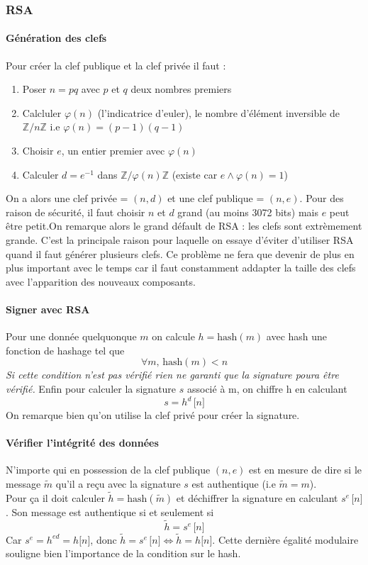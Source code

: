 \documentclass[a4paper, 12pt]{article}
\begin{document}
\subsubsection{RSA}
\paragraph{Génération des clefs}\label{keygenRSA}
\noindent Pour créer la clef publique et la clef privée il faut :
\begin{enumerate}
	\item Poser $n = pq$ avec $p$ et $q$ deux nombres premiers
	\item Calcluler $\varphi(n)$ (l'indicatrice d'euler), le nombre d'élément inversible de $\mathbb{Z}/n\mathbb{Z}$ i.e $\varphi\left( n\right) = (p-1)(q-1)$
	\item Choisir $e$, un entier premier avec $\varphi(n)$
	\item Calculer $d = e^{-1}$ dans $\mathbb{Z}/\varphi(n)\mathbb{Z}$ (existe car $e \wedge \varphi(n) = 1$) 
\end{enumerate}
On a alors une clef privée = $(n, d)$ et une clef publique = $(n,e)$. Pour des raison de sécurité, il faut choisir $n$ et $d$ grand (au moins 3072 bits) mais $e$ peut être petit.On remarque alors le grand défault de RSA :  les clefs sont extrèmement grande. C'est la principale raison pour laquelle on essaye d'éviter d'utiliser RSA quand il faut générer plusieurs clefs. Ce problème ne fera que devenir de plus en plus important avec le temps car il faut constamment addapter la taille des clefs avec l'apparition des nouveaux composants.

\paragraph{Signer avec RSA}
Pour une donnée quelquonque $m$ on calcule $h = \text{hash}(m)$ avec hash une fonction de hashage tel que 
$$
\forall m, \, \text{hash}(m) < n
$$ 
\emph{Si cette condition n'est pas vérifié rien ne garanti que la signature poura être vérifié.}
Enfin pour calculer la signature $s$ associé à m, on chiffre h en calculant 
$$
s = h^d \, \lbrack n \rbrack
$$
On remarque bien qu'on utilise la clef privé pour créer la signature.

\paragraph{Vérifier l'intégrité des données}
N'importe qui en possession de la clef publique $(n, e)$ est en mesure de dire si le message $\tilde{m}$ qu'il a reçu avec la signature $s$ est authentique (i.e $\tilde{m} = m$). \\
Pour ça il doit calculer $\tilde{h} = \text{hash}(\tilde{m})$ et déchiffrer la signature en calculant $s^e \, \lbrack n \rbrack$. Son message est authentique si et seulement si 
$$
\tilde{h} = s^e \, \lbrack n \rbrack
$$
Car $s^e = h^{ed} = h \lbrack n \rbrack$, donc $\tilde{h} = s^e \, \lbrack n \rbrack \Leftrightarrow \tilde{h} = h \lbrack n \rbrack$. Cette dernière égalité modulaire souligne bien l'importance de la condition sur le hash.
\end{document}

